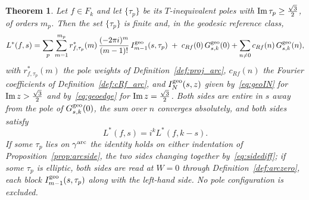\documentclass[11pt]{article}
\newtheorem{theorem}{Theorem}[section]
\begin{document}
\begin{theorem}\label{thm:geomero}
Let $f\in F_k$ and let $\{\tau_p\}$ be its $T$-inequivalent poles with
${\rm Im}\,\tau_p\ge\tfrac{\sqrt3}{2}$, of orders $m_p$. Then the set $\{\tau_p\}$ is finite
and, in the geodesic reference class,
\begin{equation}\label{eq:geomero}
L^*(f,s)=\sum_{p}\sum_{m=1}^{m_p}r^*_{f,\tau_p}(m)\,\frac{(-2\pi i)^{m}}{(m-1)!}\,
I^{\rm geo}_{m-1}(s,\tau_p)
\;+\;c_{Rf}(0)\,G^{\rm geo}_{s,k}(0)+\sum_{n\ne0}c_{Rf}(n)\,G^{\rm geo}_{s,k}(n),
\end{equation}
with $r^*_{f,\tau_p}(m)$ the pole weights of Definition~\ref{def:proj_arc}, $c_{Rf}(n)$ the
Fourier coefficients of Definition~\ref{def:cRf_arc}, and $I^{\rm geo}_N(s,z)$ given
by~\eqref{eq:geoIN} for ${\rm Im}\,z>\tfrac{\sqrt3}{2}$ and by~\eqref{eq:geoedge} for
${\rm Im}\,z=\tfrac{\sqrt3}{2}$. Both sides are entire in $s$ away from the pole of
$G^{\rm geo}_{s,k}(0)$, the sum over $n$ converges absolutely, and both sides satisfy
\begin{equation}\label{eq:geomerofe}
L^*(f,s)=i^{k}L^*(f,k-s).
\end{equation}
If some $\tau_p$ lies on
$\gamma^{\rm arc}$ the identity holds on either indentation of
Proposition~\ref{prop:arcside}, the two sides changing together by~\eqref{eq:sidediff}; if some
$\tau_p$ is elliptic, \emph{both} sides are read at $W=0$ through
Definition~\ref{def:arczero}, each block $I^{\rm geo}_{m-1}(s,\tau_p)$ along with the
left-hand side. No pole configuration is excluded.
\end{theorem}
\end{document}
